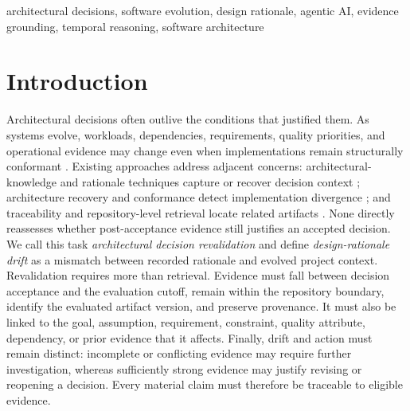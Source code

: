 \documentclass[10pt,conference]{IEEEtran}
\begin{document}
\begin{IEEEkeywords}
architectural decisions, software evolution, design rationale, agentic AI, evidence grounding, temporal reasoning, software architecture
\end{IEEEkeywords}

\section{Introduction}
\label{sec:introduction}
Architectural decisions often outlive the conditions that justified them. As systems evolve, workloads, dependencies, requirements, quality priorities, and operational evidence may change even when implementations remain structurally conformant \cite{Lehman1980Programs,Perry1992Foundations,Jansen2005Decisions}. Existing approaches address adjacent concerns: architectural-knowledge and rationale techniques capture or recover decision context \cite{Tang2006Rationale,Demir2024Survey,Santana2026ADR}; architecture recovery and conformance detect implementation divergence \cite{Bucaioni2024Continuous,Su2026Violations}; and traceability and repository-level retrieval locate related artifacts \cite{Fuchss2025Traceability,Akhavan2026LinkAnchor,Wang2026RepoReasoner}. None directly reassesses whether post-acceptance evidence still justifies an accepted decision. We call this task \emph{architectural decision revalidation} and define \emph{design-rationale drift} as a mismatch between recorded rationale and evolved project context.
Revalidation requires more than retrieval. Evidence must fall between decision acceptance and the evaluation cutoff, remain within the repository boundary, identify the evaluated artifact version, and preserve provenance. It must also be linked to the goal, assumption, requirement, constraint, quality attribute, dependency, or prior evidence that it affects. Finally, drift and action must remain distinct: incomplete or conflicting evidence may require further investigation, whereas sufficiently strong evidence may justify revising or reopening a decision. Every material claim must therefore be traceable to eligible evidence.
\end{document}
